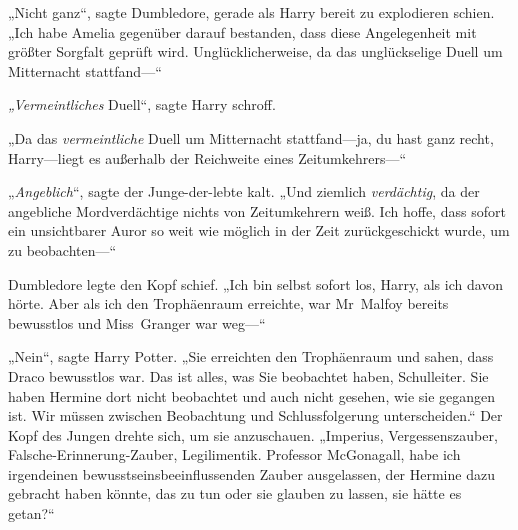 „Nicht ganz“, sagte Dumbledore, gerade als Harry bereit zu explodieren schien. „Ich habe Amelia gegenüber darauf bestanden, dass diese Angelegenheit mit größter Sorgfalt geprüft wird. Unglücklicherweise, da das unglückselige Duell um Mitternacht stattfand—“

\emph{„Vermeintliches} Duell“, sagte Harry schroff.

„Da das \emph{vermeintliche} Duell um Mitternacht stattfand—ja, du hast ganz recht, Harry—liegt es außerhalb der Reichweite eines Zeitumkehrers—“

„\emph{Angeblich}“, sagte der Junge-der-lebte kalt. „Und ziemlich \emph{verdächtig}, da der angebliche Mordverdächtige nichts von Zeitumkehrern weiß. Ich hoffe, dass sofort ein unsichtbarer Auror so weit wie möglich in der Zeit zurückgeschickt wurde, um zu beobachten—“

Dumbledore legte den Kopf schief. „Ich bin selbst sofort los, Harry, als ich davon hörte. Aber als ich den Trophäenraum erreichte, war Mr~Malfoy bereits bewusstlos und Miss~Granger war weg—“

„Nein“, sagte Harry Potter. „Sie erreichten den Trophäenraum und sahen, dass Draco bewusstlos war. Das ist alles, was Sie beobachtet haben, Schulleiter. Sie haben Hermine dort nicht beobachtet und auch nicht gesehen, wie sie gegangen ist. Wir müssen zwischen Beobachtung und Schlussfolgerung unterscheiden.“
Der Kopf des Jungen drehte sich, um sie anzuschauen.
„Imperius, Vergessenszauber, Falsche-Erinnerung-Zauber, Legilimentik. Professor McGonagall, habe ich irgendeinen bewusstseinsbeeinflussenden Zauber ausgelassen, der Hermine dazu gebracht haben könnte, das zu tun oder sie glauben zu lassen, sie hätte es getan?“

